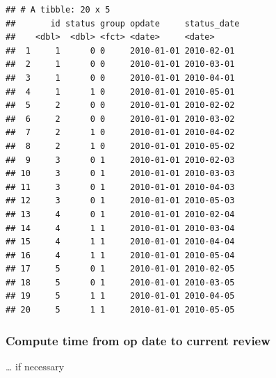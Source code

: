 \documentclass[]{book}
\newenvironment{Shaded}{\begin{snugshade}}{\end{snugshade}}
\newcommand{\DataTypeTok}[1]{\textcolor[rgb]{0.13,0.29,0.53}{#1}}
\newcommand{\KeywordTok}[1]{\textcolor[rgb]{0.13,0.29,0.53}{\textbf{#1}}}
\newcommand{\NormalTok}[1]{#1}
\newcommand{\OperatorTok}[1]{\textcolor[rgb]{0.81,0.36,0.00}{\textbf{#1}}}
\newcommand{\StringTok}[1]{\textcolor[rgb]{0.31,0.60,0.02}{#1}}
\begin{document}
\begin{verbatim}
## # A tibble: 20 x 5
##       id status group opdate     status_date
##    <dbl>  <dbl> <fct> <date>     <date>     
##  1     1      0 0     2010-01-01 2010-02-01 
##  2     1      0 0     2010-01-01 2010-03-01 
##  3     1      0 0     2010-01-01 2010-04-01 
##  4     1      1 0     2010-01-01 2010-05-01 
##  5     2      0 0     2010-01-01 2010-02-02 
##  6     2      0 0     2010-01-01 2010-03-02 
##  7     2      1 0     2010-01-01 2010-04-02 
##  8     2      1 0     2010-01-01 2010-05-02 
##  9     3      0 1     2010-01-01 2010-02-03 
## 10     3      0 1     2010-01-01 2010-03-03 
## 11     3      0 1     2010-01-01 2010-04-03 
## 12     3      0 1     2010-01-01 2010-05-03 
## 13     4      0 1     2010-01-01 2010-02-04 
## 14     4      1 1     2010-01-01 2010-03-04 
## 15     4      1 1     2010-01-01 2010-04-04 
## 16     4      1 1     2010-01-01 2010-05-04 
## 17     5      0 1     2010-01-01 2010-02-05 
## 18     5      0 1     2010-01-01 2010-03-05 
## 19     5      1 1     2010-01-01 2010-04-05 
## 20     5      1 1     2010-01-01 2010-05-05
\end{verbatim}

\hypertarget{compute-time-from-op-date-to-current-review}{%
\subsubsection{Compute time from op date to current review}\label{compute-time-from-op-date-to-current-review}}

\ldots{} if necessary

\begin{Shaded}
\end{Shaded}
\end{document}
